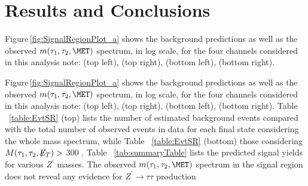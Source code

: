\section{Results and Conclusions}\label{sec:results}

Figure\,\ref{fig:SignalRegionPlot_a} shows the background predictions as well as the observed $m(\tau_{1},\tau_{2},\MET)$ spectrum, in log scale, for the four 
channels considered in this analysis note: \mutau (top left), \ditauhad (top right), \etau (bottom left), \emu (bottom right). 


\iffalse

Figure\,\ref{fig:SignalRegionPlot_a} shows the background predictions as well as the observed $m(\tau_{1},\tau_{2},\MET)$ spectrum, in log scale, for the four 
channels considered in this analysis note: \mutau (top left), \ditauhad (top right), \etau (bottom left), \emu (bottom right). 
Table ~\ref{table:EvtSR} (top) lists the number of estimated background events compared with the total number of observed events in data for each final state
considering the whole mass spectrum, while Table ~\ref{table:EvtSR} (bottom) those considering $M(\tau_1,\tau_2,\not\!\!E_T) >$ 300 \GeV. 
Table ~\ref{tab:summaryTable} lists the predicted signal yields for various $Z^{\prime}$ masses. 
The observed $m(\tau_{1},\tau_{2},\MET)$ spectrum in the signal region does not reveal any evidence for $Z^{\prime}\to\tau\tau$ production 
